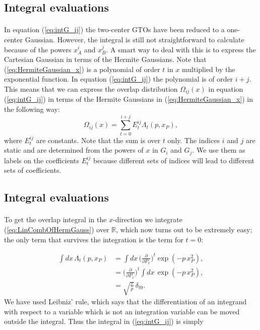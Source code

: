 \documentclass[%
twoside,                 %
final,                   %
10pt]{article}
\begin{document}
\subsection{Integral evaluations}

\paragraph{}

In equation (\ref{eq:intG_ij}) the two-center GTOs have been reduced to a one-center Gaussian.
However, the integral is still not straightforward to calculate because of the powers $x_A^i$ and $x_B^j$. A smart way to deal with this is to express the Cartesian Gaussian
in terms of the Hermite Gaussians. Note that (\ref{eq:HermiteGaussian_x}) is a polynomial of order $t$ in $x$ multiplied by the exponential function. In equation (\ref{eq:intG_ij}) the polynomial
is of order $i+j$. This means that we can express the overlap distribution $\Omega_{ij}(x)$ in equation (\ref{eq:intG_ij}) in terms of the Hermite Gaussians in (\ref{eq:HermiteGaussian_x}) in the following way:
\begin{equation}
\label{eq:LinCombOfHermGauss}
 \Omega_{ij}(x) = \sum_{t=0}^{i+j} E^{ij}_t \Lambda_t(p, x_P),
\end{equation}
where $E^{ij}_t$ are constants.
Note that the sum is over $t$ only. The indices $i$ and $j$ are static and are determined from the powers of $x$ in $G_i$ and $G_j$.
We use them as labels on the coefficients $E^{ij}_t$ because different sets of indices will lead to different sets of coefficients.



\subsection{Integral evaluations}

\paragraph{}

To get the overlap integral in the $x$-direction we integrate (\ref{eq:LinCombOfHermGauss}) over $\mathbb{R}$, which now turns out to be extremely easy;
the only term that survives the integration is the term for $t=0$:

\begin{align}
 \int dx\,\Lambda_t(p,x_P) & =  \int dx\,\Big(\frac{\partial}{\partial P_x}\Big)^t\exp(-p\,x^2_P), \\
                           & =  \Big(\frac{\partial}{\partial P_x}\Big)^t \int dx\,\exp(-p\,x^2_P), \\
                           & =  \sqrt{\frac{\pi}{p}}\,\delta_{t0}.
\end{align}
We have used Leibniz' rule, which says that the differentiation of an integrand with respect to a variable which is not an integration variable can
be moved outside the integral. Thus the integral in (\ref{eq:intG_ij}) is simply
\end{document}
